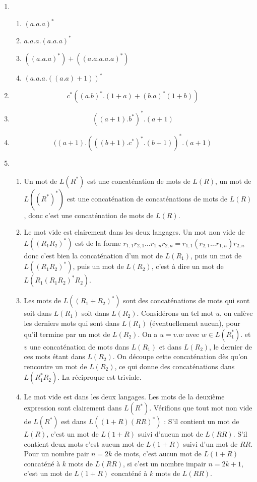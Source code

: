 \begin{enumerate}
\item 
	\begin{enumerate}
		\item $(a.a.a)^*$
		\item $a.a.a.(a.a.a)^*$
		\item $((a.a.a)^*) + ((a.a.a.a.a)^*)$
		\item $(a.a.a.((a.a)+1))^*$
	\end{enumerate}

\item 
 $$c^*((a.b)^*.(1+a) + (b.a)^*(1+b))$$

\item
 $$ ((a+1).b^*)^*.(a+1) $$

\item
 $$ ((a+1).( ((b+1).c^*)^*.(b+1) )^*.(a+1)$$

\item
\begin{enumerate}
	\item Un mot de $L(R^*)$ est une concaténation de mots de $L(R)$, un mot de $L((R^*)^*)$ est une concaténation de concaténations de mots de $L(R)$, donc c'est une concaténation de mots de $L(R)$.
	\item Le mot vide est clairement dans les deux langages. Un mot non vide de $L((R_1R_2)^*)$ est de la forme $r_{1,1}r_{2,1} \ldots r_{1,n}r_{2,n} = r_{1,1}(r_{2,1} \ldots r_{1,n})r_{2,n}$ donc c'est bien la concaténation d'un mot de $L(R_1)$, puis un mot de $L((R_1R_2)^*)$, puis un mot de $L(R_2)$, c'est à dire un mot de $L(R_1(R_1R_2)^*R_2)$.
	\item Les mots de $L((R_1+R_2)^*)$ sont des concaténations de mots qui sont soit dans $L(R_1)$ soit dans $L(R_2)$. Considérons un tel mot $u$, on enlève les derniers mots qui sont dans $L(R_1)$ (éventuellement aucun), pour qu'il termine par un mot de $L(R_2)$. On a $u=v.w$ avec $w \in L(R_1^*)$. et $v$ une concaténation de mots dans $L(R_1)$ et dans $L(R_2)$, le dernier de ces mots étant dans $L(R_2)$. On découpe cette concaténation dès qu'on rencontre un mot de $L(R_2)$, ce qui donne des concaténations dans $L(R_1^*R_2)$. La réciproque est triviale.
	\item Le mot vide est dans les deux langages. Les mots de la deuxième expression sont clairement dans $L(R^*)$. Vérifions que tout mot non vide de $L(R^*)$ est dans $L((1+R)(RR)^*)$ : S'il contient un mot de $L(R)$, c'est un mot de $L(1+R)$ suivi d'aucun mot de $L(RR)$. S'il contient deux mots c'est aucun mot de $L(1+R)$ suivi d'un mot de $RR$. Pour un nombre pair $n=2k$ de mots, c'est aucun mot de $L(1+R)$ concaténé à $k$ mots de $L(RR)$, si c'est un nombre impair $n=2k+1$, c'est un mot de $L(1+R)$ concaténé à $k$ mots de $L(RR)$.
\end{enumerate}


\end{enumerate}
